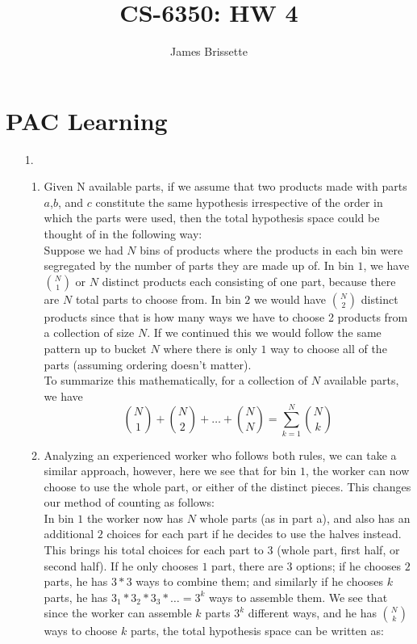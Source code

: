 \documentclass[11pt,a4paper]{article}
\author{James Brissette}
\title{CS-6350: HW 4}
\begin{document}
	\maketitle
	
	\section{PAC Learning}
		\begin{itemize}
			\item [1.]
				\begin{enumerate} [label={\alph*)}]
					\item  Given N available parts, if we assume that two products made with parts $a$,$b$, and $c$ constitute the same hypothesis irrespective of the order in which the parts were used, then the total hypothesis space could be thought of in the following way:\\ 
					
					Suppose we had $N$ bins of products where the products in each bin were segregated by the number of parts they are made up of. In bin $1$, we have ${N \choose 1}$ or $N$ distinct products each consisting of one part, because there are $N$ total parts to choose from. In bin $2$ we would have ${N \choose 2}$ distinct products since that is how many ways we have to choose 2 products from a collection of size $N$. If we continued this we would follow the same pattern up to bucket $N$ where there is only $1$ way to choose all of the parts (assuming ordering doesn't matter).\\
					
					To summarize this mathematically, for a collection of $N$ available parts, we have 
					$${N \choose 1} + {N \choose 2} + \dots + {N \choose N} = \displaystyle\sum_{k=1}^{N} {N \choose k}$$
					\item Analyzing an experienced worker who follows both rules, we can take a similar approach, however, here we see that for bin $1$, the worker can now choose to use the whole part, or either of the distinct pieces. This changes our method of counting as follows:\\
					In bin $1$ the worker now has $N$ whole parts (as in part a), and also has an additional $2$ choices for each part if he decides to use the halves instead. This brings his total choices for each part to $3$ (whole part, first half, or second half). If he only chooses $1$ part, there are $3$ options; if he chooses $2$ parts, he has $3*3$ ways to combine them; and similarly if he chooses $k$ parts, he has $3_1*3_2*3_3* \dots = 3^k$ ways to assemble them. We see that since the worker can assemble $k$ parts $3^k$ different ways, and he has ${N \choose k}$ ways to choose $k$ parts, the total hypothesis space can be written as:
					

\end{enumerate}
\end{itemize}
\end{document}
